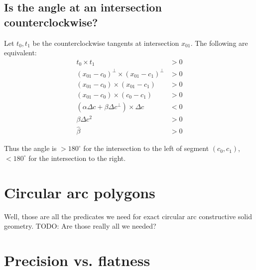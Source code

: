 \documentclass[11pt]{article}
\newcommand{\TODO}{{\color{red} TODO}}
\begin{document}
{\subsection{Is the angle at an intersection counterclockwise?}

Let $t_0, t_1$ be the counterclockwise tangents at intersection $x_{01}$.  The following are equivalent:
\begin{align*}
t_0 \times t_1 &> 0 \\
(x_{01} - c_0)^\perp \times (x_{01} - c_1)^\perp &> 0 \\
(x_{01} - c_0) \times (x_{01} - c_1) &> 0 \\
(x_{01} - c_0) \times (c_0 - c_1) &> 0 \\
(\alpha \Delta c + \beta \Delta c^\perp) \times \Delta c &< 0 \\
\beta \Delta c^2 &> 0 \\
\hat{\beta} &> 0
\end{align*}

Thus the angle is $> 180^\circ$ for the intersection to the left of segment $(c_0,c_1)$, $< 180^\circ$ for the intersection to the right.

\section{Circular arc polygons}

Well, those are all the predicates we need for exact circular arc constructive solid geometry.  \TODO: Are those really all we needed?

\section{Precision vs. flatness}

}
\end{document}
